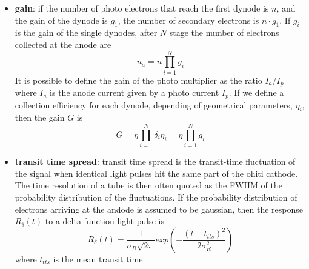 \begin{itemize}
\item \textbf{gain}: if the number of photo electrons that reach the first dynode is $n$, and the gain of the dynode is $g_{1}$, the number of secondary electrons is $n\cdot g_{1}$. If $g_{i}$ is the gain of the single dynodes, after $N$ stage the number of electrons collected at the anode are
\begin{equation}
n_{a} = n\prod_{i=1}^N g_i
\end{equation}
It is possible to define the gain of the photo multiplier as the ratio $I_{a}/I_{p}$ where $I_{a}$ is the anode current given by a photo current $I_{p}$. If we define a collection efficiency for each dynode, depending of geometrical parameters, $\eta _{i}$, then the gain $G$ is
\begin{equation}
G = \eta \prod_{i=1}^N \delta _{i} \eta _{i} = \eta \prod_{i=1}^N g_{i}
\end{equation}
\item \textbf{transit time spread}: transit time spread is the transit-time fluctuation of the signal when identical light pulses hit the same part of the ohiti cathode. The time resolution of a tube is then often quoted as the FWHM of the probability distribution of the fluctuations.
If the probability distribution of electrons arriving at the andode is assumed to be gaussian, then the response $R_{\delta}(t)$ to a delta-function light pulse is
\begin{equation}
R_{\delta}(t) = \frac{1}{\sigma _{R}\sqrt {2\pi}}exp\left( -\frac{(t-t_{tts})^2}{2\sigma _{R}^2}\right)
\end{equation}
where $t_{tts}$ is the mean transit time.
\end{itemize}

